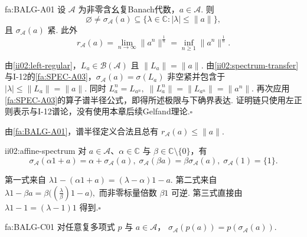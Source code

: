 \begin{FATheorem}[A][Banach代数谱非空紧与谱半径公式]{fa:BALG-A01}
设 \(\displaystyle \mathcal A\) 为非零含幺复Banach代数，\(\displaystyle a\in\mathcal A\). 则
\[
\varnothing\neq\sigma_{\mathcal A}(a)
\subseteq
\{\lambda\in\mathbb C:|\lambda|\leqslant\|a\|\},
\]
且 \(\displaystyle\sigma_{\mathcal A}(a)\) 紧. 此外
\[
r_{\mathcal A}(a)
=
\lim_{n\to\infty}\|a^n\|^{\frac{1}{n}}
=
\inf_{n\geqslant1}\|a^n\|^{\frac{1}{n}}.
\]
\end{FATheorem}

\begin{FAProof}
由\autoref{ii02:left-regular}，\(\displaystyle L_a\in\mathcal B(\mathcal A)\) 且 \(\displaystyle\|L_a\|=\|a\|\). 由\autoref{ii02:spectrum-transfer}与I-12的\autoref{fa:SPEC-A03}，\(\displaystyle\sigma_{\mathcal A}(a)=\sigma(L_a)\) 非空紧并包含于 \(\displaystyle |\lambda|\leqslant\|L_a\|=\|a\|\). 同时
\(\displaystyle L_a^n=L_{a^n},\; \|L_a^n\|=\|L_{a^n}\|=\|a^n\|.\)
再次应用\autoref{fa:SPEC-A03}的算子谱半径公式，即得所述极限与下确界表达. 证明链只使用左正则表示与I-12谱论，没有使用本章后续Gelfand理论.\hfill\(\square\)
\end{FAProof}

由\autoref{fa:BALG-A01}，谱半径定义合法且总有 \(\displaystyle r_{\mathcal A}(a)\leqslant\|a\|\).

\begin{FAProposition}[C][谱的仿射规则]{ii02:affine-spectrum}
对 \(\displaystyle a\in\mathcal A\)、\(\displaystyle\alpha\in\mathbb C\) 与 \(\displaystyle\beta\in\mathbb C\setminus\{0\}\)，有
\[
\sigma_{\mathcal A}(\alpha1+a)=\alpha+\sigma_{\mathcal A}(a),
\;
\sigma_{\mathcal A}(\beta a)=\beta\sigma_{\mathcal A}(a),
\;
\sigma_{\mathcal A}(1)=\{1\}.
\]
\end{FAProposition}

\begin{FAProof}
第一式来自 \(\displaystyle \lambda1-(\alpha1+a)=(\lambda-\alpha)1-a\). 第二式来自
\(\displaystyle \lambda1-\beta a = \beta\bigl((\frac{\lambda}{\beta})1-a\bigr),\)
而非零标量倍数 \(\displaystyle\beta1\) 可逆. 第三式直接由 \(\displaystyle\lambda1-1=(\lambda-1)1\) 得到.\hfill\(\square\)
\end{FAProof}

\begin{FATheorem}[C][多项式谱映射工具]{fa:BALG-C01}
对任意复多项式 \(\displaystyle p\) 与 \(\displaystyle a\in\mathcal A\)，
\(\displaystyle \sigma_{\mathcal A}(p(a)) = p(\sigma_{\mathcal A}(a)).\)
\end{FATheorem}

